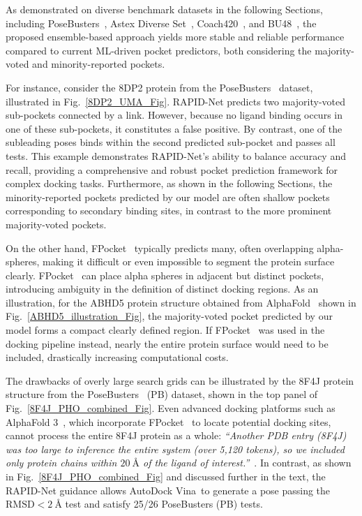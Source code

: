\documentclass[10pt,conference]{IEEEtran}
\begin{document}
As demonstrated on diverse benchmark datasets in the following Sections, including PoseBusters~\cite{Buttenschoen2024}, Astex Diverse Set~\cite{hartshorn2007diverse}, Coach420~\cite{Roy2012}, and BU48~\cite{Huang2006}, the proposed ensemble-based approach yields more stable and reliable performance compared to current ML-driven pocket predictors, both considering the majority-voted and minority-reported pockets.

For instance, consider the 8DP2 protein from the PoseBusters~\cite{Buttenschoen2024} dataset, illustrated in Fig.~\ref{8DP2_UMA_Fig}. RAPID-Net predicts two majority-voted sub-pockets connected by a link. However, because no ligand binding occurs in one of these sub-pockets, it constitutes a false positive. By contrast, one of the subleading poses binds within the second predicted sub-pocket and passes all tests. This example demonstrates RAPID-Net's ability to balance accuracy and recall, providing a comprehensive and robust pocket prediction framework for complex docking tasks. Furthermore, as shown in the following Sections, the minority-reported pockets predicted by our model are often shallow pockets corresponding to secondary binding sites, in contrast to the more prominent majority-voted pockets. 

On the other hand, FPocket~\cite{le2009fpocket} typically predicts many, often overlapping alpha-spheres, making it difficult or even impossible to segment the protein surface clearly. FPocket~\cite{le2009fpocket} can place alpha spheres in adjacent but distinct pockets, introducing ambiguity in the definition of distinct docking regions. As an illustration, for the ABHD5 protein structure obtained from AlphaFold~\cite{jumper2021highly} shown in Fig.~\ref{ABHD5_illustration_Fig}, the majority-voted pocket predicted by our model forms a compact clearly defined region. If FPocket~\cite{le2009fpocket} was used in the docking pipeline instead, nearly the entire protein surface would need to be included, drastically increasing computational costs. 




The drawbacks of overly large search grids can be illustrated by the 8F4J protein structure from the PoseBusters~\cite{Buttenschoen2024} (PB) dataset, shown in the top panel of Fig.~\ref{8F4J_PHO_combined_Fig}. Even advanced docking platforms such as AlphaFold 3~\cite{abramson2024accurate}, which incorporate FPocket~\cite{le2009fpocket} to locate potential docking sites, cannot process the entire 8F4J protein as a whole:
\textit{``Another PDB entry (8F4J) was too large to inference the entire system (over 5,120 tokens), so we included only protein chains within $20\ \text{\AA}$ of the ligand of interest.''}~\cite{abramson2024accurate}. In contrast, as shown in Fig.~\ref{8F4J_PHO_combined_Fig} and discussed further in the text, the RAPID-Net guidance allows AutoDock Vina~\cite{trott2010autodock,eberhardt2021autodock}to generate a pose passing the $\text{RMSD}<2\ \text{\AA}$ test and satisfy 25/26 PoseBusters (PB) tests.
\end{document}
